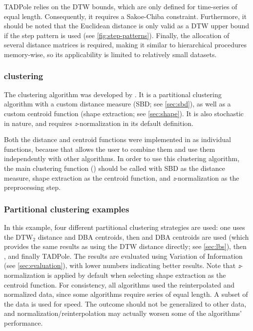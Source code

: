 TADPole relies on the DTW bounds,
which are only defined for time-series of equal length.
Consequently, it requires a Sakoe-Chiba constraint.
Furthermore, it should be noted that the Euclidean distance is only valid as a DTW upper bound if the  step pattern is used (see \cref{fig:step-patterns}).
Finally, the allocation of several distance matrices is required,
making it similar to hierarchical procedures memory-wise,
so its applicability is limited to relatively small datasets.

\subsubsection{\kshape{} clustering}
\label{sec:kshape}

The \kshape{} clustering algorithm was developed by \citet{paparrizos2015}.
It is a partitional clustering algorithm with a custom distance measure (SBD; see \cref{sec:sbd}),
as well as a custom centroid function (shape extraction; see \cref{sec:shape}).
It is also stochastic in nature,
and requires \textit{z}-normalization in its default definition.

Both the distance and centroid functions were implemented in \dtwclust{} as individual functions,
because that allows the user to combine them and use them independently with other algorithms.
In order to use this clustering algorithm,
the main clustering function () should be called with SBD as the distance measure,
shape extraction as the centroid function,
and \textit{z}-normalization as the preprocessing step.

\subsubsection{Partitional clustering examples}

In this example,
four different partitional clustering strategies are used:
one uses the $\text{DTW}_2$ distance and DBA centroids,
then  and DBA centroids are used
(which provides the same results as using the DTW distance directly; see \cref{sec:lbs}),
then \kshape{},
and finally TADPole.
The results are evaluated using Variation of Information (see \cref{sec:evaluation}),
with lower numbers indicating better results.
Note that \textit{z}-normalization is applied by default when selecting shape extraction as the centroid function.
For consistency, all algorithms used the reinterpolated and normalized data,
since some algorithms require series of equal length.
A subset of the data is used for speed.
The outcome should not be generalized to other data,
and normalization/reinterpolation may actually worsen some of the algorithms' performance.

